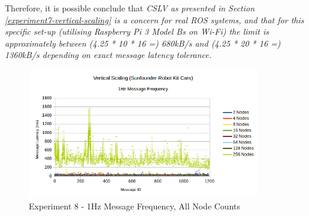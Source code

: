 \documentclass[../dissertation.tex]{subfiles}
\begin{document}
Therefore, it is possible conclude that \textit{CSLV as presented in Section \ref{experiment7-vertical-scaling} is a concern for real ROS systems, and that for this specific set-up (utilising Raspberry Pi 3 Model Bs on Wi-Fi) the limit is approximately between (4.25 * 10 * 16 =) 680kB/s and (4.25 * 20 * 16 =) 1360kB/s depending on exact message latency tolerance.}

\begin{figure}[H]
\centering
\includegraphics[width=0.9\textwidth]{images/experiment9/vertical_scaling_1Hz_all_freqs.png}
\caption{Experiment 8 - 1Hz Message Frequency, All Node Counts}
\label{exp8-1hz}
\end{figure}
\end{document}
